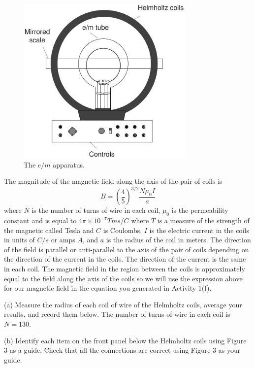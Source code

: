 \begin{figure}[!b]
\begin{center}
\includegraphics[height=3.25in]{eoverm2/apparatus1.eps}
\caption{The $e/m$ apparatus.}
\end{center}
\end{figure}

The magnitude of the magnetic field along the axis of the pair of coils is
\begin{equation}
B = \left ( \frac{4}{5} \right )^{3/2} \frac{N \mu_0 I}{a}
\end{equation}
where $N$ is the number of turns of wire in each coil, $\mu_0$ is the permeability constant 
and is equal to $4\pi\times 10^{-7} Tms/C$ where $T$ is a measure of the strength of the magnetic called
Tesla and $C$ is Coulombs,  $I$ is the electric current in the coils in units of $C/s$ or amps $A$,
and $a$ is the radius of the coil in meters.
The direction of the field is parallel or anti-parallel
to the axis of the pair of coils depending on the direction of the current
in the coils.
The direction of the current is the same in each coil.
The magnetic field in the region between the coils is approximately equal
to the field along the axis of the coils so we will use
the expression above for our magnetic field in the equation you generated in
Activity 1(f).

(a) Measure the radius of each coil of wire of the Helmholtz coils, 
average your results, and record them
below.
The number of turns of wire in each coil is $N=130$.
\vspace{15mm}


(b) Identify each item on the front panel below
the Helmholtz coils using Figure 3 as a guide.
Check that all the connections are correct using Figure 3 as your guide. 

